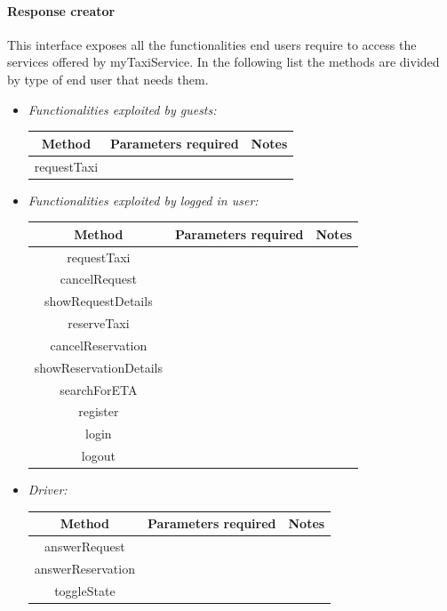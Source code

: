 \documentclass{article}
\begin{document}
\paragraph{Response creator}
This interface exposes all the functionalities end users require to access the services offered by myTaxiService. 
In the following list the methods are divided by type of end user that needs them.
\begin{itemize}
	\item \textit{Functionalities exploited by guests:}	
			\begin{tabular}{*{3}{c}}
				\toprule
				Method & Parameters required & Notes \\
				\midrule
				requestTaxi &  & \\ %
				\bottomrule
			\end{tabular}
	
	\item \textit{Functionalities exploited by logged in user:} %
		\begin{tabular}{*{3}{c}}
			\toprule
			Method & Parameters required & Notes \\
			\midrule
			requestTaxi &  & \\ %
			cancelRequest & & \\ %
			showRequestDetails & & \\
			reserveTaxi & &  \\
			cancelReservation & & \\
			showReservationDetails & & \\
			searchForETA & & \\
			register & & \\
			login & & \\
			logout & & \\
			\bottomrule
		\end{tabular}

	\item \textit{Driver:}

				\begin{tabular}{*{3}{c}}
					\toprule
					Method & Parameters required & Notes \\
					\midrule
					answerRequest & & \\ %
					answerReservation & & \\ %
					toggleState & & \\
					\bottomrule
				\end{tabular}


\end{itemize}
\end{document}
